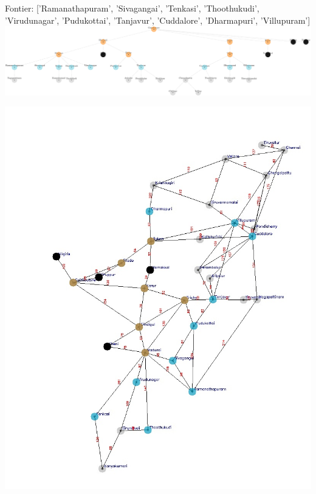 \documentclass[xcolor=table]{beamer}
\begin{document}
\begin{frame}
  { \tiny Fontier: ['Ramanathapuram', 'Sivagangai', 'Tenkasi', 'Thoothukudi', 'Virudunagar', 'Pudukottai', 'Tanjavur', 'Cuddalore', 'Dharmapuri', 'Villupuram'] }
  \includegraphics[width=1\textwidth]{../BFSNodes/17-1.png}
  \begin{center}
    \includegraphics[height=0.55\textheight]{../BFSoutput/tamilBFS15.jpg}
  \end{center}
\end{frame}
\end{document}
